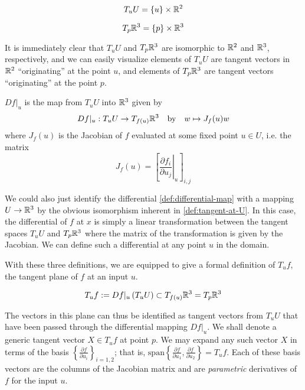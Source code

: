     
    \begin{defn} \label{def:tangent-at-U}
    	\[ T_{u} U = \left\{u\right\} \times \mathbb{R}^2
    	\]
    	\end{defn}
    \begin{defn} \label{def:tangent-of-R3}
    	\[ T_{p} \mathbb{R}^3 = \{p\} \times \mathbb{R}^3
    	\]
    \end{defn}
    It is immediately clear that $T_uU$ and $T_p\mathbb{R}^3$ are isomorphic to
    $\mathbb{R}^2$ and $\mathbb{R}^3$, respectively, and we can easily visualize elements of $T_uU$ are tangent vectors in $\mathbb{R}^2$ ``originating'' at the point $u$, and elements of $T_p\mathbb{R}^3$ are tangent vectors ``originating'' at the point $p$.
\begin{defn} \label{def:differential-map}
       	$Df\vert_u$ is the map from $T_uU$ into $\mathbb{R}^3$ given by
    \[
     Df|_u : T_uU \to T_{f(u)}\mathbb{R}^3
     \quad \textrm{by}
     \quad w \mapsto J_f (u) w
    \]
where $J_f(u)$ is the Jacobian of $f$ evaluated at some fixed point $u \in U$, i.e. the matrix
\[
J_f (u) = \left[ \left.\frac{\partial f_i}{\partial u_j}\right\vert_u \right]_{i,j}
\]
\end{defn} %
We could also just identify the differential \cref{def:differential-map}  with a mapping $U \to \mathbb{R}^3$ by the obvious isomorphism inherent in \cref{def:tangent-at-U}. In this case, the differential of $f$ at $x$ is simply a linear transformation between the tangent spaces $T_uU$ and $T_p\mathbb{R}^3$ where the matrix of the transformation is given by the Jacobian. We can define such a differential at any point $u$ in the domain.

With these three definitions, we are equipped to give a formal definition of $T_uf$,
the tangent plane of $f$ at an input $u$.
\begin{defn}\label{def:tangent-plane}
\[
T_u f := Df\vert_u \left(T_u U\right)
\subset T_{f(u)} \mathbb{R}^3 = T_{p} \mathbb{R}^3
\]
\end{defn}

The vectors in this plane can thus be identified as tangent vectors from $T_uU$ that have been passed through the differential mapping $Df\vert_u$.
We shall denote a generic tangent vector $X \in T_u f$ at point $p$.
We may expand any such vector $X$ in terms of the basis $\left\{ \frac{\partial f}{\partial u_i}\right\}_{i=1,2}$; that is,
$\textrm{span}\left\{ \frac{\partial f}{\partial u_1}, \frac{\partial f}{\partial u_2}\right\} = T_u f$. Each of these basis vectors are the columns of the Jacobian matrix and are \textit{parametric} derivatives of $f$ for the input $u$.  

